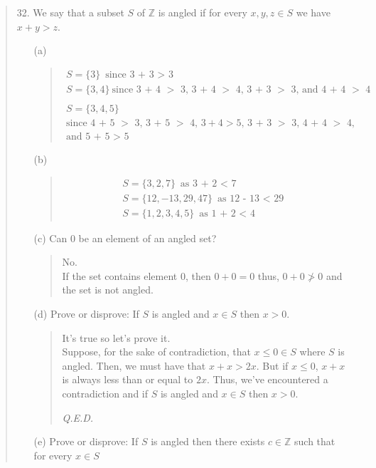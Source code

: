 \documentclass[12pt, a4paper]{article}                      %
\begin{document}
\begin{enumerate}
\begin{quote}
\item[32.]
We say that a subset $S$ of $\mathbb{Z}$ is angled if for every $x, y, z \in S$ we have $x + y > z$.
\begin{itemize}
\item[(a)]
\begin{quote}
\begin{gather*}
S = \{3\} \ \mbox{since 3 + 3 $>$ 3}\\
S = \{3, 4\} \ \mbox{since 3 + 4 $>$ 3, 3 + 4 $>$ 4, 3 + 3 $>$ 3, and 4 + 4 $>$ 4}\\\\
S = \{3, 4, 5\}\\
\mbox{since 4 + 5 $>$ 3, 3 + 5 $>$ 4, $3 + 4 > 5$, 3 + 3 $>$ 3, 4 + 4 $>$ 4,}\\
\mbox{and 5 + 5 $>$ 5}
\end{gather*}
\end{quote}
\item[(b)]
\begin{quote}
\begin{gather*}
S = \{3, 2, 7\} \ \mbox{as 3 + 2 $<$ 7}\\
S = \{12, -13, 29, 47\} \ \mbox{as 12 - 13 $<$ 29}\\
S = \{1, 2, 3, 4, 5\} \ \mbox{as 1 + 2 $<$ 4}
\end{gather*}
\end{quote}
\item[(c)]
Can 0 be an element of an angled set?
\begin{quote}
No.\\
If the set contains element 0, then $0 + 0 = 0$ thus, $0 + 0 \not> 0$
and the set is not angled.
\end{quote}
\item[(d)]
Prove or disprove: If $S$ is angled and $x \in S$ then $x > 0$.
\begin{quote}
It's true so let's prove it.\\
Suppose, for the sake of contradiction, that $x \leq 0 \in S$ where $S$ is angled.
Then, we must have that $x + x > 2x$. But if $x \leq 0$, $x + x$ is always less than or equal to $2x$.
Thus, we've encountered a contradiction and if $S$ is angled and $x \in S$ then $x > 0$.
\begin{flushright}
\textit{Q.E.D.}
\end{flushright}
\end{quote}
\item[(e)]
Prove or disprove: If $S$ is angled then there exists $c \in \mathbb{Z}$ such that for every $x \in S$

\end{itemize}
\end{quote}
\end{enumerate}
\end{document}

